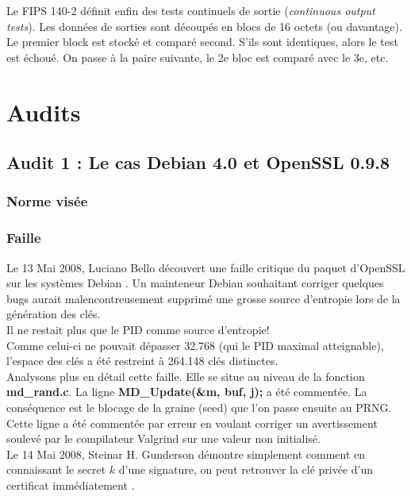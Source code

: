 Le FIPS 140-2 définit enfin des tests continuels de sortie (\textit{continuous output tests}). Les données de sorties sont découpés en blocs de 16 octets (ou davantage). Le premier block est stocké et comparé second. S'ils sont identiques, alors le test est échoué. On passe à la paire suivante, le 2e bloc est comparé avec le 3e, etc.





\section{Audits}
	\subsection{Audit 1 : Le cas Debian 4.0 et OpenSSL 0.9.8}
	\subsubsection{Norme visée}
	\subsubsection{Faille}
		Le 13 Mai 2008, Luciano Bello découvert une faille critique du 
		paquet d'OpenSSL sur les systèmes Debian
		\cite{faille2008linux.org}. Un mainteneur Debian 	
		souhaitant corriger quelques bugs aurait malencontreusement 	
		supprimé une grosse source d'entropie lors de la génération des 
		clés. \\
		Il ne restait plus que le PID comme source d'entropie!\\
		Comme celui-ci ne pouvait dépasser 32.768 (qui le PID maximal
		atteignable), l'espace des clés a été restreint à 264.148 clés
		distinctes.\\
		
		Analysons plus en détail cette faille. Elle se situe au niveau de 
		la fonction \textbf{md\_rand.c}.
		La ligne \textbf{MD\_Update(\&m, buf, j);} a été commentée.
		La conséquence est le blocage de la graine (seed) que l'on 
		passe ensuite au PRNG.\\
	
		Cette ligne a été commentée par erreur en voulant corriger un
		avertissement soulevé par le compilateur Valgrind sur une valeur
		non initialisé.\\
	
		Le 14 Mai 2008, Steinar H. Gunderson démontre simplement comment
		en connaissant le secret $k$ d'une signature, on peut retrouver
		la clé privée d'un certificat immédiatement \cite{gunderson2008}.\\
	
